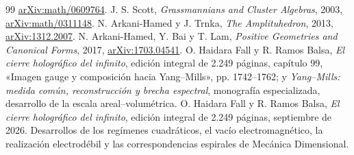 \documentclass[a4paper,10pt]{article}
\theoremstyle{definition}\newtheorem{definition}[theorem]{Definición}
\theoremstyle{remark}\newtheorem{remark}[theorem]{Observación}
\numberwithin{equation}{section}
\begin{document}
\begin{thebibliography}{99}
\href{https://arxiv.org/abs/math/0609764}{arXiv:math/0609764}.
 J. S. Scott,
\emph{Grassmannians and Cluster Algebras}, 2003,
\href{https://arxiv.org/abs/math/0311148}{arXiv:math/0311148}.
 N. Arkani-Hamed y J. Trnka,
\emph{The Amplituhedron}, 2013,
\href{https://arxiv.org/abs/1312.2007}{arXiv:1312.2007}.
 N. Arkani-Hamed, Y. Bai y T. Lam,
\emph{Positive Geometries and Canonical Forms}, 2017,
\href{https://arxiv.org/abs/1703.04541}{arXiv:1703.04541}.
 O. Haidara Fall y R. Ramos Balsa,
\emph{El cierre holográfico del infinito}, edición integral de 2.249 páginas,
capítulo 99, «Imagen gauge y composición hacia Yang--Mills», pp. 1742--1762;
y \emph{Yang--Mills: medida común, reconstrucción y brecha espectral},
monografía especializada, desarrollo de la escala areal--volumétrica.
 O. Haidara Fall y R. Ramos Balsa,
\emph{El cierre holográfico del infinito}, edición integral de 2.249 páginas,
septiembre de 2026. Desarrollos de los regímenes cuadráticos, el vacío
electromagnético, la realización electrodébil y las correspondencias
espirales de Mecánica Dimensional.

\end{thebibliography}
\end{document}

